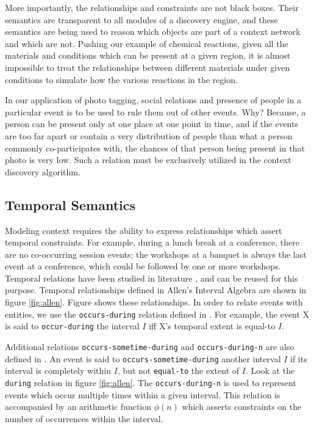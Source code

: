 More importantly, the relationships and constraints are not black boxes. Their semantics are transparent to all modules of a discovery engine, and these semantics are being used to reason which objects are part of a context network and which are not. Pushing our example of chemical reactions, given all the materials and conditions which can be present at a given region, it is almost impossible to treat the relationships between different materials under given conditions to simulate how the various reactions in the region.

In our application of photo tagging, social relations and presence of people in a particular event is to be used to rule them out of other events. Why? Because, a person can be present only at one place at one point in time, and if the events are too far apart or contain a very distribution of people than what a person commonly co-participates with, the chances of that person being present in that photo is very low. Such a relation must be exclusively utilized in the context discovery algorithm.

\subsection{Temporal Semantics}
Modeling context requires the ability to express relationships which assert temporal constraints. For example, during a lunch break at a conference, there are no co-occurring session events; the workshops at a banquet is always the last event at a conference, which could be followed by one or more workshops. Temporal relations have been studied in literature \cite{allen1983maintaining, wolter2000spatio}, and can be reused for this purpose. Temporal relationships defined in Allen's Interval Algebra are shown in figure \ref{fig:allen}. Figure shows these relationships. In order to relate events with entities, we use the \texttt{occurs-during} relation defined in \cite{gupta2011managing}. For example, the event X is said to \texttt{occur-during} the interval $I$ iff X's temporal extent is equal-to $I$. 

Additional relations \texttt{occurs-sometime-during} and \texttt{occurs-during-n} are also defined in \cite{gupta2011managing}. An event is said to \texttt{occurs-sometime-during} another interval $I$ if its interval is completely within $I$, but not \texttt{equal-to} the extent of $I$. Look at the \texttt{during} relation in figure \ref{fig:allen}. The \texttt{occurs-during-n} is used to represent events which occur multiple times within a given interval. This relation is accompanied by an arithmetic function $\phi(n)$ which asserts constraints on the number of occurrences within the interval.

